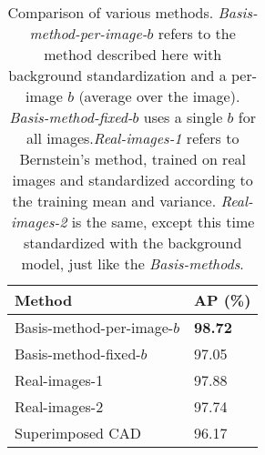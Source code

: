 \documentclass{article}
\begin{document}
\begin{table}
    \centering
    \begin{tabular}{|l|l|}
        \hline
        Method & AP (\%) \\
        \hline 
        Basis-method-per-image-$b$ & \textbf{98.72} \\
        Basis-method-fixed-$b$ &     97.05 \\
        Real-images-1 &              97.88 \\
        Real-images-2 &              97.74 \\
        Superimposed CAD &           96.17 \\
        \hline
    \end{tabular}
    \caption{Comparison of various methods. {\em Basis-method-per-image-$b$} refers to the method described here with background standardization and a per-image $b$ (average over the image). {\em Basis-method-fixed-$b$} uses a single $b$ for all images.{\em Real-images-1} refers to Bernstein's method, trained on real images and standardized according to the training mean and variance. {\em Real-images-2} is the same, except this time standardized with the background model, just like the {\em Basis-methods}. } \label{tab:comp}
\end{table}
\end{document}
